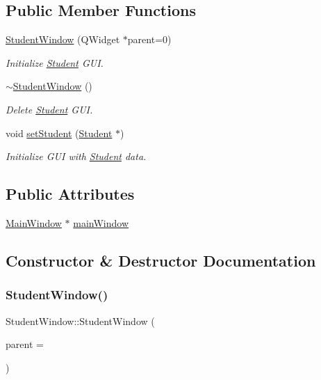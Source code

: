 \subsection*{Public Member Functions}
\begin{DoxyCompactItemize}
\item 
\hyperlink{class_student_window_a2b1c9c5068ba799d52fd308d2f4d615f}{Student\+Window} (Q\+Widget $\ast$parent=0)
\begin{DoxyCompactList}\small\item\em Initialize \hyperlink{class_student}{Student} G\+UI. \end{DoxyCompactList}\item 
\hyperlink{class_student_window_ae22fb05936dfd5801fccba3873ad5eac}{$\sim$\+Student\+Window} ()
\begin{DoxyCompactList}\small\item\em Delete \hyperlink{class_student}{Student} G\+UI. \end{DoxyCompactList}\item 
void \hyperlink{class_student_window_ad413a2d54e47846392e75383e5ff8774}{set\+Student} (\hyperlink{class_student}{Student} $\ast$)
\begin{DoxyCompactList}\small\item\em Initialize G\+UI with \hyperlink{class_student}{Student} data. \end{DoxyCompactList}\end{DoxyCompactItemize}
\subsection*{Public Attributes}
\begin{DoxyCompactItemize}
\item 
\hyperlink{class_main_window}{Main\+Window} $\ast$ \hyperlink{class_student_window_acbbffa742dd57a3f3f8600b461ddf628}{main\+Window}
\end{DoxyCompactItemize}


\subsection{Constructor \& Destructor Documentation}
\mbox{\label{class_student_window_a2b1c9c5068ba799d52fd308d2f4d615f}} 
\subsubsection{\texorpdfstring{Student\+Window()}{StudentWindow()}}
{\footnotesize\ttfamily Student\+Window\+::\+Student\+Window (\begin{DoxyParamCaption}\item[{Q\+Widget $\ast$}]{parent = {} }\end{DoxyParamCaption})\hspace{0.3cm}{\ttfamily [explicit]}}



